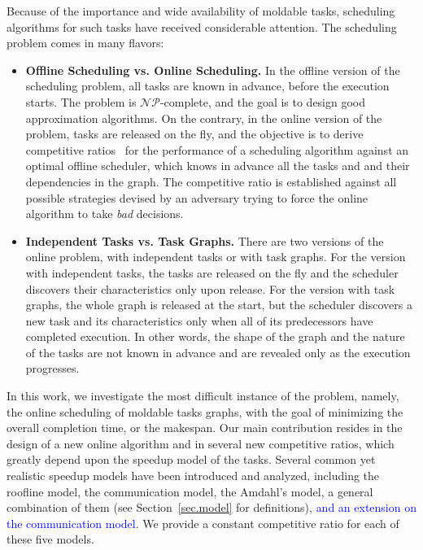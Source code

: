 \documentclass{article}
\newcommand{\new}[1]{\textcolor{blue}{#1}}
\begin{document}
Because of the importance and wide availability of moldable tasks,
scheduling algorithms for such tasks have received considerable attention. The scheduling problem comes in many flavors:

\begin{itemize}[leftmargin=*]
\item \textbf{Offline Scheduling vs. Online Scheduling.} In the offline version of the scheduling problem, all tasks are known in advance, before the execution starts. The problem is $\mathcal{NP}$-complete, and the goal is to design good approximation algorithms. On the contrary, in the online version of the problem,
tasks are released on the fly, and the objective is to derive competitive ratios~\cite{Sleator1985} for the performance of a scheduling algorithm
against an optimal offline scheduler, which knows in advance all the tasks and and their dependencies in the graph. The competitive ratio is established against all possible strategies devised by an adversary trying to force the online algorithm to take \emph{bad} decisions.
\item \textbf{Independent Tasks vs. Task Graphs.} There are two versions of the online problem, with independent tasks
or with task graphs.
For the version with independent tasks, the tasks are released on the fly and the scheduler discovers their characteristics only upon release. For the version with task graphs, the whole graph is released at the start, but the scheduler discovers a new task and its characteristics only when all of its predecessors have completed execution. In other words, the shape of the graph and the nature of the tasks are not known in advance and are revealed only as the execution progresses.
\end{itemize}

In this work, we investigate the most difficult instance of the problem, namely, the online scheduling of moldable tasks graphs, with the goal of minimizing the overall completion time, or the makespan.
Our main contribution resides in the design of a new online algorithm and in several new competitive ratios,
which greatly depend upon the speedup model of the tasks. Several common yet realistic speedup models have been introduced
and analyzed, including the roofline model, the communication model, the Amdahl's model, a general combination of them (see Section~\ref{sec.model} for definitions), \new{and an extension on the communication model}.
We provide a constant competitive ratio for each of these five models. 
\end{document}
